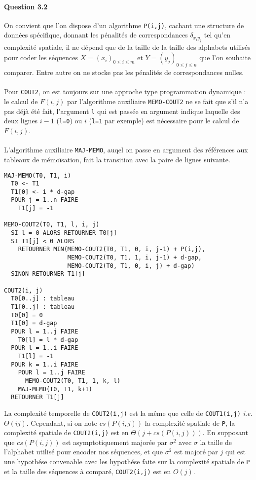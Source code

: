\paragraph{Question 3.2}
On convient que l'on dispose d'un algorithme \verb'P(i,j)', cachant
une structure de donn\'ees sp\'ecifique, donnant les p\'enalit\'es de
correspondances $\delta_{x_iy_j}$ tel qu'en complexit\'e spatiale, il
ne d\'epend que de la taille de la taille des alphabets utilis\'es
pour coder les s\'equences $X=(x_i)_{0\leq i\leq m}$ et
$Y=(y_j)_{0\leq j\leq n}$ que l'on souhaite comparer. Entre autre on
ne stocke pas les p\'enalit\'es de correspondances nulles.\\\\
Pour \verb'COUT2', on est toujours sur une approche type programmation
dynamique : le calcul de $F(i,j)$ par l'algorithme auxiliaire
\verb'MEMO-COUT2' ne se fait que s'il n'a pas d\'ej\`a \'et\'e fait,
l'argument \verb'l' qui est pass\'ee en argument indique laquelle des
deux lignes $i-1$ (\verb'l=0') ou $i$ (\verb'l=1' par exemple) est
n\'ecessaire pour le calcul de $F(i,j)$.\\\\
L'algorithme auxiliaire \verb'MAJ-MEMO', auqel on passe en argument
des r\'ef\'erences aux tableaux de m\'emo\"isation, fait la transition
avec la paire de lignes suivante.
\begin{verbatim}
MAJ-MEMO(T0, T1, i)
  T0 <- T1
  T1[0] <- i * d-gap
  POUR j = 1..n FAIRE
    T1[j] = -1

MEMO-COUT2(T0, T1, l, i, j)
  SI l = 0 ALORS RETOURNER T0[j]
  SI T1[j] < 0 ALORS
    RETOURNER MIN(MEMO-COUT2(T0, T1, 0, i, j-1) + P(i,j),
                  MEMO-COUT2(T0, T1, 1, i, j-1) + d-gap,
                  MEMO-COUT2(T0, T1, 0, i, j) + d-gap)
  SINON RETOURNER T1[j]

COUT2(i, j)
  T0[0..j] : tableau
  T1[0..j] : tableau
  T0[0] = 0
  T1[0] = d-gap
  POUR l = 1..j FAIRE
    T0[l] = l * d-gap
  POUR l = 1..i FAIRE
    T1[l] = -1
  POUR k = 1..i FAIRE
    POUR l = 1..j FAIRE
      MEMO-COUT2(T0, T1, 1, k, l)
    MAJ-MEMO(T0, T1, k+1)
  RETOURNER T1[j]
\end{verbatim}
La complexit\'e temporelle de \verb'COUT2(i,j)' est la m\^eme que
celle de \verb'COUT1(i,j)' \emph{i.e.} $\Theta(ij)$. Cependant, si on
note $cs(P(i,j))$ la complexit\'e spatiale de \verb'P', la
complexit\'e spatiale de \verb'COUT2(i,j)' est en
$\Theta(j+cs(P(i,j)))$. En supposant que $cs(P(i,j))$ est
asymptotiquement major\'ee par $\sigma^2$ avec $\sigma$ la taille de
l'alphabet utilis\'e pour encoder nos s\'equences, et que $\sigma^2$
est major\'e par $j$ qui est une hypoth\'ese convenable avec les
hypoth\'ese faite sur la complexit\'e spatiale de \verb'P' et la
taille des s\'equences \`a compar\'e, \verb'COUT2(i,j)' est en $O(j)$.

